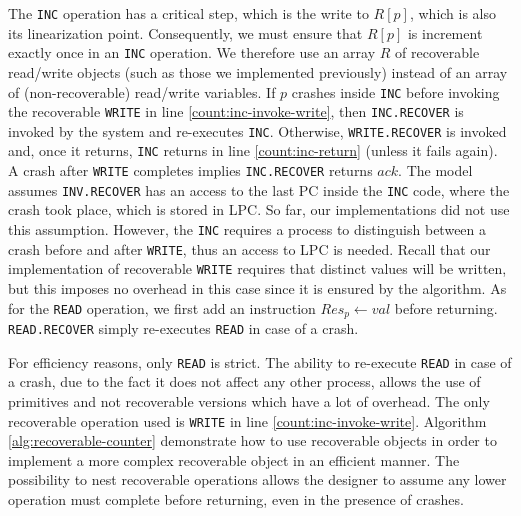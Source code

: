The \texttt{INC} operation has a critical step, which is the write to $R[p]$, which is also its linearization point. Consequently, we must ensure that $R[p]$ is increment exactly once in an \texttt{INC} operation. We therefore use an array $R$ of recoverable read/write objects (such as those we implemented previously) instead of an array of (non-recoverable) read/write variables. If $p$ crashes inside \texttt{INC} before invoking the recoverable \texttt{WRITE} in line \ref{count:inc-invoke-write}, then \texttt{INC.RECOVER} is invoked by the system and re-executes \texttt{INC}. Otherwise, \texttt{WRITE.RECOVER} is invoked and, once it returns, \texttt{INC} returns in line \ref{count:inc-return} (unless it fails again).
\color{blue} A crash after \texttt{WRITE} completes implies \texttt{INC.RECOVER} returns $ack$. The model assumes \texttt{INV.RECOVER} has an access to the last PC inside the \texttt{INC} code, where the crash took place, which is stored in LPC. So far, our implementations did not use this assumption. However, the \texttt{INC} requires a process to distinguish between a crash before and after \texttt{WRITE}, thus an access to LPC is needed. \color{black}
Recall that our implementation of recoverable \texttt{WRITE} requires that distinct values will be written, but this imposes no overhead in this case since it is ensured by the algorithm. As for the \texttt{READ} operation, we first add an instruction $Res_p \gets val$ before returning. \texttt{READ.RECOVER} simply re-executes \texttt{READ} in case of a crash.



For efficiency reasons, only \texttt{READ} is strict. The ability to re-execute \texttt{READ} in case of a crash, due to the fact it does not affect any other process, allows the use of primitives and not recoverable versions which have a lot of overhead. The only recoverable operation used is \texttt{WRITE} in line \ref{count:inc-invoke-write}. Algorithm \ref{alg:recoverable-counter} demonstrate how to use recoverable objects in order to implement a more complex recoverable object in an efficient manner. The possibility to nest recoverable operations allows the designer to assume any lower operation must complete before returning, even in the presence of crashes.


